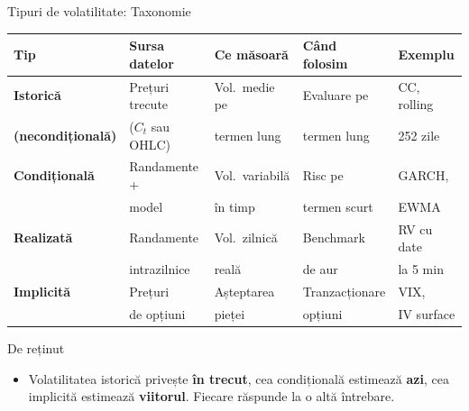 \documentclass[9pt, aspectratio=169, t]{beamer}
\theoremstyle{definition}
\begin{document}
\begin{frame}{Tipuri de volatilitate: Taxonomie}
\begin{center}
{\footnotesize
\renewcommand{\arraystretch}{1.3}
\begin{tabular}{>{\bfseries}lllll}
\toprule
\textbf{Tip} & \textbf{Sursa datelor} & \textbf{Ce măsoară} & \textbf{Când folosim} & \textbf{Exemplu} \\
\midrule
Istorică & Prețuri trecute & Vol.\ medie pe & Evaluare pe & CC, rolling \\
(necondițională) & ($C_t$ sau OHLC) & termen lung & termen lung & 252 zile \\
\midrule
Condițională & Randamente + & Vol.\ variabilă & Risc pe & GARCH, \\
 & model & în timp & termen scurt & EWMA \\
\midrule
Realizată & Randamente & Vol.\ zilnică & Benchmark & RV cu date \\
 & intrazilnice & reală & de aur & la 5 min \\
\midrule
Implicită & Prețuri & Așteptarea & Tranzacționare & VIX, \\
 & de opțiuni & pieței & opțiuni & IV surface \\
\bottomrule
\end{tabular}
}
\end{center}
\vspace{0.05cm}
\begin{alertblock}{De reținut}
\begin{itemize}\setlength{\itemsep}{0pt}
    \item Volatilitatea istorică privește \textbf{în trecut}, cea condițională estimează \textbf{azi}, cea implicită estimează \textbf{viitorul}. Fiecare răspunde la o altă întrebare.
\end{itemize}
\end{alertblock}
\end{frame}
\end{document}
